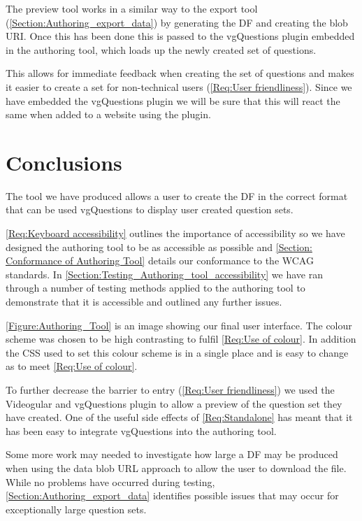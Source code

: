 The preview tool works in a similar way to the export tool (\autoref{Section:Authoring_export_data}) by generating the \gls{DF} and creating the \gls{blob} URI. Once this has been done this is passed to the \gls{vgQuestions} plugin embedded in the authoring tool, which loads up the newly created set of questions.

This allows for immediate feedback when creating the set of questions and makes it easier to create a set for non-technical users (\cref{Req:User friendliness}). Since we have embedded the \gls{vgQuestions} plugin we will be sure that this will react the same when added to a website using the plugin.

\section{Conclusions}
\label{Section:Authoring_Conclusion}

The tool we have produced allows a user to create the \gls{DF} in the correct format that can be used \gls{vgQuestions} to display user created question sets.

\cref{Req:Keyboard accessibility} outlines the importance of accessibility so we have designed the authoring tool to be as accessible as possible and \autoref{Section: Conformance of Authoring Tool} details our conformance to the \gls{WCAG} standards. In \autoref{Section:Testing_Authoring_tool_accessibility} we have ran through a number of testing methods applied to the authoring tool to demonstrate that it is accessible and outlined any further issues.

\autoref{Figure:Authoring_Tool} is an image showing our final user interface. The colour scheme was chosen to be high contrasting to fulfil \cref{Req:Use of colour}. In addition the \gls{CSS} used to set this colour scheme is in a single place and is easy to change as to meet \cref{Req:Use of colour}.

To further decrease the barrier to entry (\cref{Req:User friendliness}) we used the \gls{Videogular} and \gls{vgQuestions} plugin to allow a preview of the question set they have created. One of the useful side effects of \cref{Req:Standalone} has meant that it has been easy to integrate \gls{vgQuestions} into the authoring tool.

Some more work may needed to investigate how large a \gls{DF} may be produced when using the data \gls{blob} URL approach to allow the user to download the file. While no problems have occurred during testing, \autoref{Section:Authoring_export_data} identifies possible issues that may occur for exceptionally large question sets.

